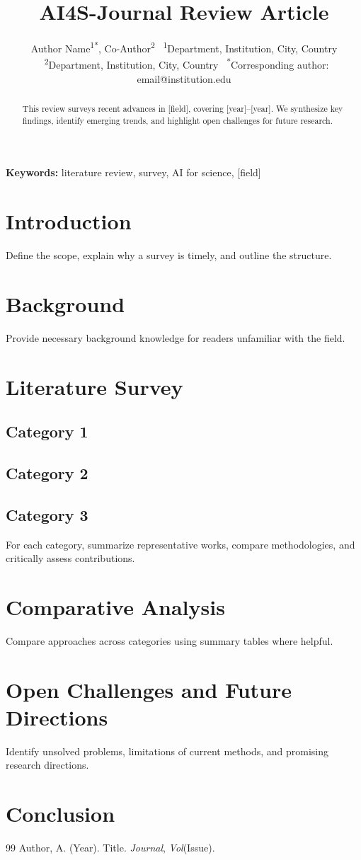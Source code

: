 \documentclass[12pt,a4paper]{article}
\title{\textbf{\textcolor{ai4sgold}{AI4S-Journal} Review Article}}
\author{Author Name\textsuperscript{1*}, Co-Author\textsuperscript{2} \
\textsuperscript{1}Department, Institution, City, Country \
\textsuperscript{2}Department, Institution, City, Country \
\textsuperscript{*}Corresponding author: email@institution.edu}
\date{}
\begin{document}
\maketitle

\begin{abstract}
This review surveys recent advances in [field], covering [year]--[year].
We synthesize key findings, identify emerging trends, and highlight open
challenges for future research.
\end{abstract}
\noindent\textbf{Keywords:} literature review, survey, AI for science, [field]

\section{Introduction}
Define the scope, explain why a survey is timely, and outline the structure.

\section{Background}
Provide necessary background knowledge for readers unfamiliar with the field.

\section{Literature Survey}
\subsection{Category 1}
\subsection{Category 2}
\subsection{Category 3}
For each category, summarize representative works, compare methodologies,
and critically assess contributions.

\section{Comparative Analysis}
Compare approaches across categories using summary tables where helpful.

\section{Open Challenges and Future Directions}
Identify unsolved problems, limitations of current methods, and promising
research directions.

\section{Conclusion}


\begin{thebibliography}{99}
 Author, A. (Year). Title. \textit{Journal}, \textit{Vol}(Issue).
\end{thebibliography}
\end{document}
